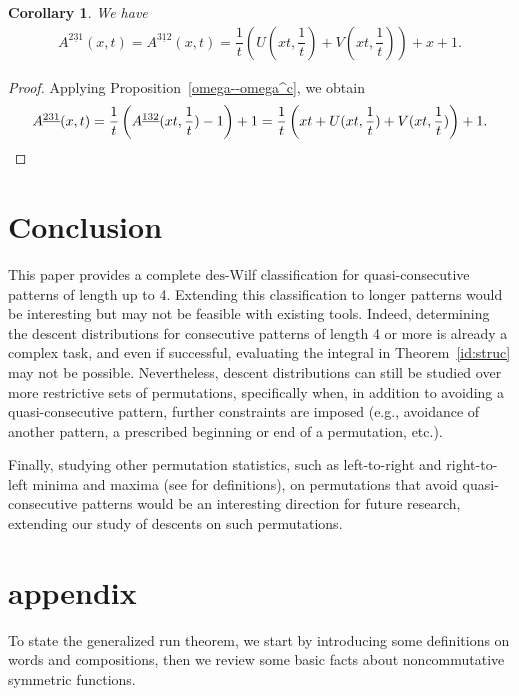\documentclass[11pt,reqno]{amsart}
\numberwithin{equation}{section}
\theoremstyle{plain}
\newtheorem{corollary}[theorem]{Corollary}
\theoremstyle{definition}
\def\des{\mathrm{des}}
\begin{document}
\begin{corollary}\label{231}
We have
    \begin{align*}
    A^{\underline{231}}(x,t)=A^{\underline{312}}(x,t)=\dfrac{1}{t} \left(U(xt,\dfrac{1}{t})+V(xt,\dfrac{1}{t})\right)+x+1.
    \end{align*}
\end{corollary}

\begin{proof}
    Applying Proposition~\ref{omega--omega^c}, we obtain
    \begin{equation*}
    A^{\underline{231}}(x,t)=\dfrac{1}{t} \left(A^{\underline{132}}(xt,\dfrac{1}{t})-1\right)+1=\dfrac{1}{t} \left(xt+U(xt,\dfrac{1}{t})+V(xt,\dfrac{1}{t})\right)+1. \qedhere
    \end{equation*}
\end{proof}


\section{Conclusion}\label{conclusion}

This paper provides a complete $\des$-Wilf classification for quasi-consecutive patterns of length up to 4. Extending this classification to longer patterns would be interesting but may not be feasible with existing tools. Indeed, determining the descent distributions for consecutive patterns of length 4 or more is already a complex task, and even if successful, evaluating the integral in Theorem~\ref{id:struc} may not be possible. Nevertheless, descent distributions can still be studied over more restrictive sets of permutations, specifically when, in addition to avoiding a quasi-consecutive pattern, further constraints are imposed (e.g., avoidance of another pattern, a prescribed beginning or end of a permutation, etc.).

Finally, studying other permutation statistics, such as left-to-right and right-to-left minima and maxima  (see \cite{HK} for definitions), on permutations that avoid quasi-consecutive patterns would be an interesting direction for future research, extending our study of descents on such permutations.

\section{appendix}\label{sec:appendix}

To state the generalized run theorem, we start by introducing some definitions on words and compositions, then we review some basic facts about noncommutative symmetric functions. 
\end{document}
